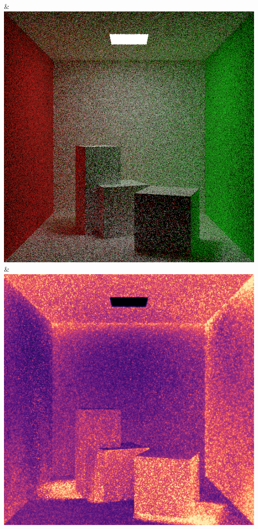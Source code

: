 & \includegraphics[width=\linewidth]{figures/py/tests/quality_comparison/sppm_1spp_diffuse.png}
\\
& \includegraphics[width=\linewidth]{figures/py/tests/quality_comparison/pt_1spp_diffuse_flip.png}
